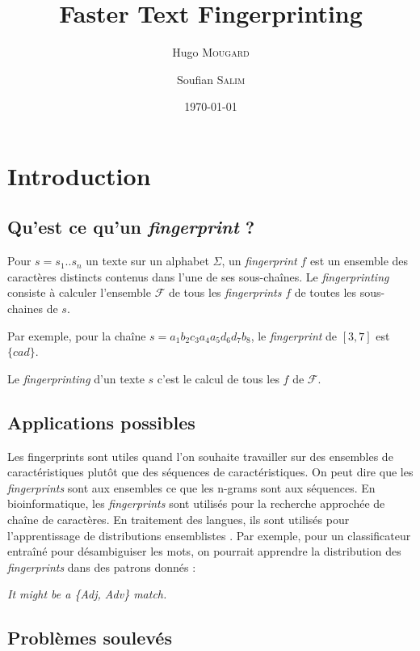 \documentclass[a4paper]{article}
\title{Faster Text Fingerprinting}
\author{Hugo \textsc{Mougard} \and Soufian \textsc{Salim}}
\date{\today}
\begin{document}
\maketitle
\section{Introduction}

\subsection{Qu'est ce qu'un \emph{fingerprint} ?}

Pour $s = s_{1} .. s_{n}$ un texte sur un alphabet $\Sigma$, un \textit{fingerprint} $f$ est un ensemble des caractères distincts contenus dans l'une de ses sous-chaînes. Le \emph{fingerprinting} consiste à calculer l'ensemble $\mathcal{F}$ de tous les \emph{fingerprints} $f$ de toutes les sous-chaines de $s$.  \newline

Par exemple, pour la chaîne $s = a_{1} b_{2} c_{3} a_{4} a_{5} d_{6} d_{7} b_{8}$, le \emph{fingerprint} de $[3,7]$ est $\{cad\}$. \newline

Le \emph{fingerprinting} d'un texte $s$ c'est le calcul de tous les $f$ de $\mathcal{F}$.

\subsection{Applications possibles}

Les fingerprints sont utiles quand l'on souhaite travailler sur des ensembles de caractéristiques plutôt que des séquences de caractéristiques. On peut dire que les \emph{fingerprints} sont aux ensembles ce que les n-grams sont aux séquences. En bioinformatique, les \emph{fingerprints} sont utilisés pour la recherche approchée de chaîne de caractères. En traitement des langues, ils sont utilisés pour l'apprentissage de distributions ensemblistes \cite{amir}. Par exemple, pour un classificateur entraîné pour désambiguiser les mots, on pourrait apprendre la distribution des \emph{fingerprints} dans des patrons donnés : \newline

\emph{It might be a \{Adj, Adv\} match.}

\subsection{Problèmes soulevés}
\end{document}

